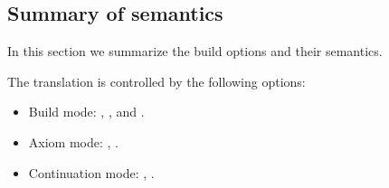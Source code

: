 \subsection{Summary of semantics}

In this section we summarize the build options and their semantics.

The translation is controlled by the following options:

\begin{itemize}
  \item Build mode: , , and .
  \item Axiom mode: , .
  \item Continuation mode: , .
\end{itemize}

